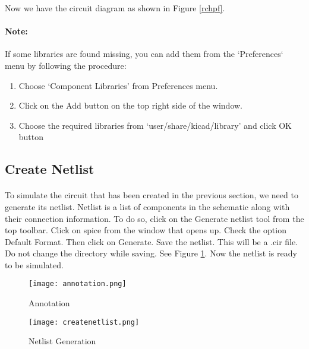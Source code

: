 Now we have the circuit diagram as shown in Figure \ref{rchpf}.


\paragraph{Note:} If some libraries are found missing, you can add them from the `Preferences` menu by following the procedure: 

\begin{enumerate}
\item
Choose `Component Libraries' from Preferences menu.

\item
Click on the Add button on the top right side of the window.

\item
Choose the required libraries from `user/share/kicad/library' and click OK button

\end{enumerate}

\subsection{Create Netlist}

\paragraph{}To simulate the circuit that has been created in the previous section, we need to generate
its netlist. Netlist is a list of components in the schematic along with their connection
information. To do so, click on the Generate netlist tool from the top toolbar. Click on
spice from the window that opens up. Check the option Default Format. Then click
on Generate. Save the netlist. This will be a .cir file. Do
not change the directory while saving. See Figure \ref{createnetlistRC}.
 Now the netlist is ready to be simulated. 
\begin{figure}
\begin{minipage}{.5\textwidth}
  \centering
  \texttt{[image: annotation.png]}
  \caption{Annotation}
  \label{annotationRC}
\end{minipage}%
\begin{minipage}{.5\textwidth}
  \centering
  \texttt{[image: createnetlist.png]}
  \caption{Netlist Generation}
  \label{createnetlistRC}
\end{minipage}
\end{figure}

